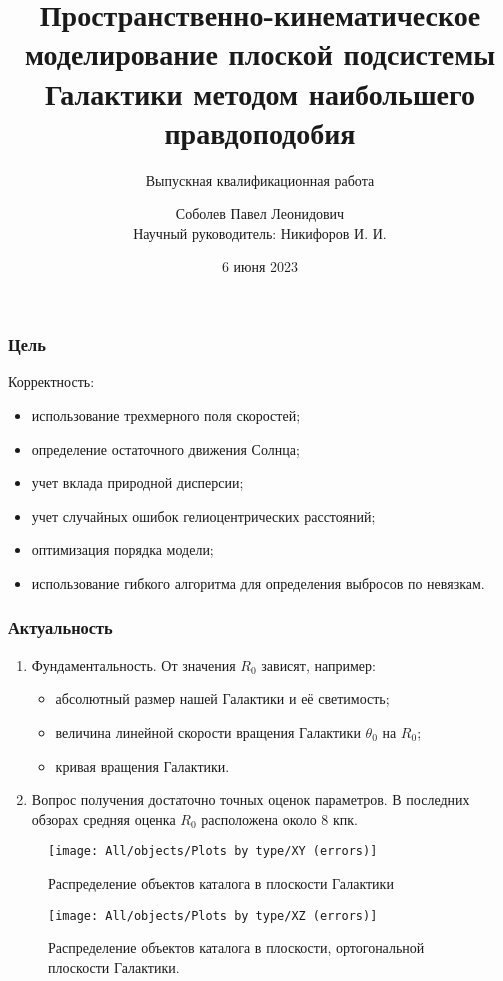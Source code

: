 \documentclass{beamer}
\title{Пространственно-кинематическое моделирование плоской подсистемы Галактики методом наибольшего правдоподобия}
\subtitle{Выпускная квалификационная работа}
\author{Соболев Павел Леонидович\\Научный руководитель: Никифоров И. И.}
\date{6 июня 2023}
\begin{document}
\begin{frame}
\titlepage
\end{frame}

\begin{frame}
\frametitle{Цель}
Корректность:
\begin{itemize}
  \item использование трехмерного поля скоростей;
  \item определение остаточного движения Солнца;
  \item учет вклада природной дисперсии;
  \item учет случайных ошибок гелиоцентрических расстояний;
  \item оптимизация порядка модели;
  \item использование гибкого алгоритма для определения выбросов по невязкам.
\end{itemize}
\end{frame}

\begin{frame}
\frametitle{Актуальность}
\begin{enumerate}
  \item Фундаментальность. От значения $ R_0 $ зависят, например:
  \begin{itemize}
    \item абсолютный размер нашей Галактики и её светимость;
    \item величина линейной скорости вращения Галактики $ \theta_0 $ на $ R_0 $;
    \item кривая вращения Галактики.
  \end{itemize}
  \item Вопрос получения достаточно точных оценок параметров. В последних обзорах средняя оценка $ R_0 $ расположена около 8 кпк.
\end{enumerate}
\end{frame}

\begin{frame}
\begin{figure}
  \centering
  \texttt{[image: All/objects/Plots by type/XY (errors)]}
  \caption{Распределение объектов каталога в плоскости Галактики}
\end{figure}
\end{frame}

\begin{frame}
\begin{figure}
  \centering
  \texttt{[image: All/objects/Plots by type/XZ (errors)]}
  \caption{Распределение объектов каталога в плоскости, ортогональной плоскости Галактики.}
\end{figure}
\end{frame}
\end{document}
